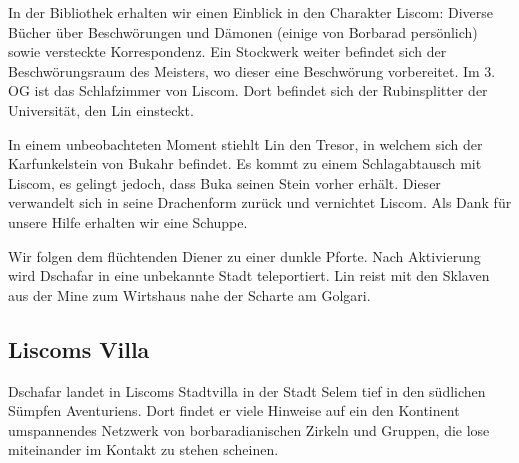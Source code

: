 In der Bibliothek erhalten wir einen Einblick in den Charakter Liscom:
Diverse Bücher über Beschwörungen und Dämonen (einige von Borbarad
persönlich) sowie versteckte Korrespondenz. Ein Stockwerk weiter
befindet sich der Beschwörungsraum des Meisters, wo dieser eine
Beschwörung vorbereitet. Im 3. OG ist das Schlafzimmer von Liscom. Dort
befindet sich der Rubinsplitter der Universität, den Lin einsteckt.

In einem unbeobachteten Moment stiehlt Lin den Tresor, in welchem sich
der Karfunkelstein von Bukahr befindet. Es kommt zu einem Schlagabtausch
mit Liscom, es gelingt jedoch, dass Buka seinen Stein vorher erhält.
Dieser verwandelt sich in seine Drachenform zurück und vernichtet
Liscom. Als Dank für unsere Hilfe erhalten wir eine Schuppe.

Wir folgen dem flüchtenden Diener zu einer dunkle Pforte. Nach
Aktivierung wird Dschafar in eine unbekannte Stadt teleportiert. Lin
reist mit den Sklaven aus der Mine zum Wirtshaus nahe der Scharte am
Golgari.

\hypertarget{liscoms-villa}{%
\subsection{Liscoms Villa}\label{liscoms-villa}}

Dschafar landet in Liscoms Stadtvilla in der Stadt Selem tief in den
südlichen Sümpfen Aventuriens. Dort findet er viele Hinweise auf ein den
Kontinent umspannendes Netzwerk von borbaradianischen Zirkeln und
Gruppen, die lose miteinander im Kontakt zu stehen scheinen.
